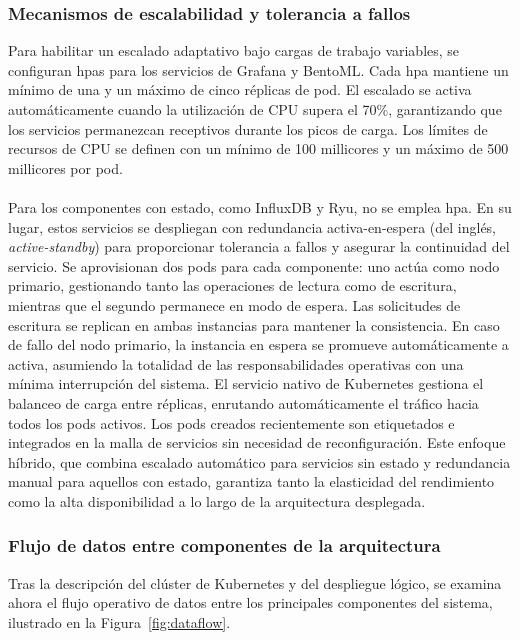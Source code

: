 \subsubsection{Mecanismos de escalabilidad y tolerancia a fallos}

Para habilitar un escalado adaptativo bajo cargas de trabajo variables, se configuran \glspl{hpa} para los servicios de Grafana y BentoML. Cada \gls{hpa} mantiene un mínimo de una y un máximo de cinco réplicas de pod. El escalado se activa automáticamente cuando la utilización de CPU supera el 70\%, garantizando que los servicios permanezcan receptivos durante los picos de carga. Los límites de recursos de CPU se definen con un mínimo de 100 millicores y un máximo de 500 millicores por pod.\\
\\
Para los componentes con estado, como InfluxDB y Ryu, no se emplea \gls{hpa}. En su lugar, estos servicios se despliegan con redundancia activa-en-espera (del inglés, \textit{active-standby}) para proporcionar tolerancia a fallos y asegurar la continuidad del servicio. Se aprovisionan dos pods para cada componente: uno actúa como nodo primario, gestionando tanto las operaciones de lectura como de escritura, mientras que el segundo permanece en modo de espera. Las solicitudes de escritura se replican en ambas instancias para mantener la consistencia. En caso de fallo del nodo primario, la instancia en espera se promueve automáticamente a activa, asumiendo la totalidad de las responsabilidades operativas con una mínima interrupción del sistema. El servicio nativo de Kubernetes gestiona el balanceo de carga entre réplicas, enrutando automáticamente el tráfico hacia todos los pods activos. Los pods creados recientemente son etiquetados e integrados en la malla de servicios sin necesidad de reconfiguración. Este enfoque híbrido, que combina escalado automático para servicios sin estado y redundancia manual para aquellos con estado, garantiza tanto la elasticidad del rendimiento como la alta disponibilidad a lo largo de la arquitectura desplegada.


\subsubsection{Flujo de datos entre componentes de la arquitectura}

Tras la descripción del clúster de Kubernetes y del despliegue lógico, se examina ahora el flujo operativo de datos entre los principales componentes del sistema, ilustrado en la Figura~\ref{fig:dataflow}.

